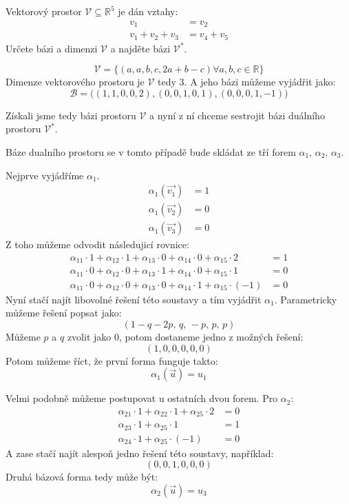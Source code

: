 \begin{example}
    Vektorový prostor $\mathcal{V} \subseteq \mathbb{R}^5$ je dán vztahy:
    \begin{align*}
        v_1 &= v_2\\
        v_1 + v_2 + v_3 &= v_4 + v_5
    \end{align*}
    Určete bázi a dimenzi $\mathcal{V}$ a najděte bázi $\mathcal{V}^*$.

    $$\mathcal{V} = \{(a, a, b, c, 2a + b -c) \forall a, b, c \in \mathbb{R}\}$$
    Dimenze vektorového prostoru je $\mathcal{V}$ tedy 3.
    A jeho bázi můžeme vyjádřit jako:
    $$\mathcal{B} = \big( (1, 1, 0, 0, 2), (0, 0, 1, 0, 1), (0, 0, 0, 1, -1) \big)$$

    Získali jsme tedy bázi prostoru $\mathcal{V}$ a nyní z ní chceme sestrojit bázi duálního
    prostoru $\mathcal{V}^*$.

    Báze dualního prostoru se v tomto případě bude skládat ze tří forem $\alpha_1,\,\alpha_2,\,\alpha_3$.

    Nejprve vyjádříme $\alpha_1$.
    \begin{align*}
        \alpha_1(\vec{v_1}) &= 1\\
        \alpha_1(\vec{v_2}) &= 0\\
        \alpha_1(\vec{v_3}) &= 0
    \end{align*}
    Z toho můžeme odvodit následujicí rovnice:
    \begin{align*}
        \alpha_{11} \cdot 1 + \alpha_{12} \cdot 1 + \alpha_{13} \cdot 0 + \alpha_{14} \cdot 0 + \alpha_{15} \cdot 2 &= 1\\
        \alpha_{11} \cdot 0 + \alpha_{12} \cdot 0 + \alpha_{13} \cdot 1 + \alpha_{14} \cdot 0 + \alpha_{15} \cdot 1 &= 0\\
        \alpha_{11} \cdot 0 + \alpha_{12} \cdot 0 + \alpha_{13} \cdot 0 + \alpha_{14} \cdot 1 + \alpha_{15} \cdot (-1) &= 0
    \end{align*}
    Nyní stačí najít libovolné řešení této soustavy a tím vyjádřit $\alpha_1$.
    Parametricky můžeme řešení popsat jako:
    $$(1-q-2p,\, q,\, -p,\, p,\, p)$$
    Můžeme $p$ a $q$ zvolit jako 0, potom dostaneme jedno z možných řešení:
    $$(1, 0, 0, 0, 0, 0)$$
    Potom můžeme říct, že první forma funguje takto:
    $$\alpha_1(\vec{u}) = u_1$$

    Velmi podobně můžeme postupovat u ostatních dvou forem.
    Pro $\alpha_2$:
    \begin{align*}
        \alpha_{21} \cdot 1 + \alpha_{22} \cdot 1 + \alpha_{25} \cdot 2 &= 0\\
        \alpha_{23} \cdot 1 + \alpha_{25} \cdot 1 &= 1\\
        \alpha_{24} \cdot 1 + \alpha_{25} \cdot (-1) &= 0
    \end{align*}
    A zase stačí najít alespoň jedno řešení této soustavy, například:
    $$(0, 0, 1, 0, 0, 0)$$
    Druhá bázová forma tedy může být:
    $$\alpha_2(\vec{u}) = u_3$$


\end{example}
